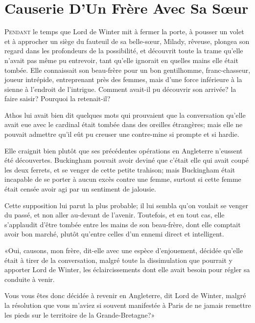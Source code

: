 
\chapter{Causerie D'Un Frère Avec Sa Sœur}

\lettrine{P}{endant} le temps que Lord de Winter mit à fermer la porte, à pousser un volet et à approcher un siège du fauteuil de sa belle-sœur, Milady, rêveuse, plongea son regard dans les profondeurs de la possibilité, et découvrit toute la trame qu'elle n'avait pas même pu entrevoir, tant qu'elle ignorait en quelles mains elle était tombée. Elle connaissait son beau-frère pour un bon gentilhomme, franc-chasseur, joueur intrépide, entreprenant près des femmes, mais d'une force inférieure à la sienne à l'endroit de l'intrigue. Comment avait-il pu découvrir son arrivée? la faire saisir? Pourquoi la retenait-il? 

Athos lui avait bien dit quelques mots qui prouvaient que la conversation qu'elle avait eue avec le cardinal était tombée dans des oreilles étrangères; mais elle ne pouvait admettre qu'il eût pu creuser une contre-mine si prompte et si hardie. 

Elle craignit bien plutôt que ses précédentes opérations en Angleterre n'eussent été découvertes. Buckingham pouvait avoir deviné que c'était elle qui avait coupé les deux ferrets, et se venger de cette petite trahison; mais Buckingham était incapable de se porter à aucun excès contre une femme, surtout si cette femme était censée avoir agi par un sentiment de jalousie. 

Cette supposition lui parut la plus probable; il lui sembla qu'on voulait se venger du passé, et non aller au-devant de l'avenir. Toutefois, et en tout cas, elle s'applaudit d'être tombée entre les mains de son beau-frère, dont elle comptait avoir bon marché, plutôt qu'entre celles d'un ennemi direct et intelligent. 

«Oui, causons, mon frère, dit-elle avec une espèce d'enjouement, décidée qu'elle était à tirer de la conversation, malgré toute la dissimulation que pourrait y apporter Lord de Winter, les éclaircissements dont elle avait besoin pour régler sa conduite à venir. 

\speak  Vous vous êtes donc décidée à revenir en Angleterre, dit Lord de Winter, malgré la résolution que vous m'aviez si souvent manifestée à Paris de ne jamais remettre les pieds sur le territoire de la Grande-Bretagne?» 

